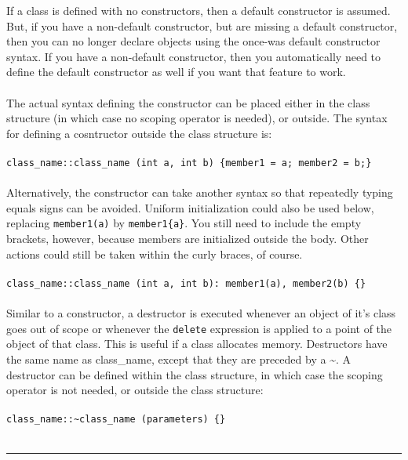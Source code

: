 \documentclass[10pt]{article}
\begin{document}
\begin{flushleft}
If a class is defined with no constructors, then a default constructor is assumed. But, if you have a non-default constructor, but are missing a default constructor, then you can no longer declare objects using the once-was default constructor syntax. If you have a non-default constructor, then you automatically need to define the default constructor as well if you want that feature to work.\\
\\
The actual syntax defining the constructor can be placed either in the class structure (in which case no scoping operator is needed), or outside. The syntax for defining a cosntructor outside the class structure is:\\
\\
\color{red}\texttt{class\_name::class\_name (int a, int b) \{member1 = a; member2 = b;\}}\color{black}\\
\\
Alternatively, the constructor can take another syntax so that repeatedly typing equals signs can be avoided. Uniform initialization could also be used below, replacing \texttt{member1(a)} by \texttt{member1\{a\}}. You still need to include the empty brackets, however, because members are initialized outside the body. Other actions could still be taken within the curly braces, of course.\\
\\
\color{red}\texttt{class\_name::class\_name (int a, int b): member1(a), member2(b) \{\}}\color{black}\\
\\
Similar to a constructor, a destructor is executed whenever an object of it's class goes out of scope or whenever the \texttt{delete} expression is applied to a point of the object of that class. This is useful if a class allocates memory. Destructors have the same name as class\_name, except that they are preceded by a \textasciitilde. A destructor can be defined within the class structure, in which case the scoping operator is not needed, or outside the class structure:\\
\\
\color{red}\texttt{class\_name::\textasciitilde class\_name (parameters) \{\}}\color{black}\\
\\
\noindent\rule{16.5cm}{0.4pt}
\end{flushleft}
\end{document}
